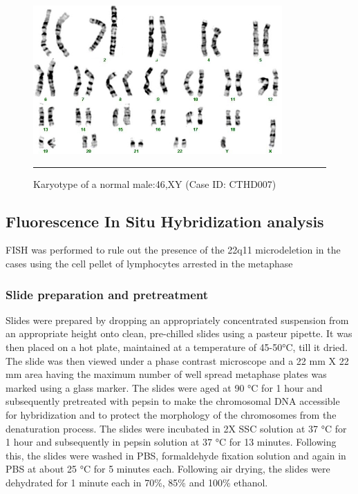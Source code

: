 \begin{refsection}
\begin{figure}[!tb]
\centering
\includegraphics[width=\linewidth]{Figures/2_3nmlmale.pdf} 
\rule{35em}{0.5pt}
\caption[Karyotype of a normal male]{Karyotype of a normal male:46,XY (Case ID: CTHD007)}
\label{fig:2_3nmlmale}
\end{figure}

\subsection{Fluorescence In Situ Hybridization analysis}\label{fish}
FISH was performed to rule out the presence of the 22q11 microdeletion in the cases using the cell pellet of lymphocytes arrested in the metaphase
\subsubsection{Slide preparation and pretreatment}
Slides were prepared by dropping an appropriately concentrated suspension from an appropriate height onto clean, pre-chilled slides using a pasteur pipette. It was then placed on a hot plate, maintained at a temperature of 45-50°C, till it dried. The slide was then viewed under a phase contrast microscope and a 22 mm X 22 mm area having the maximum number of well spread metaphase plates was marked using a glass marker. The slides were aged at 90 °C for 1 hour and subsequently pretreated with pepsin to make the chromosomal DNA accessible for hybridization and to protect the morphology of the chromosomes from the denaturation process. The slides were incubated in 2X SSC solution at 37 °C for 1 hour and subsequently in pepsin solution at 37 °C for 13 minutes. Following this, the slides were washed in PBS, formaldehyde fixation solution and again in PBS at about 25 °C for 5 minutes each. Following air drying, the slides were dehydrated for 1 minute each in 70\%, 85\% and 100\% ethanol.

\end{refsection}
